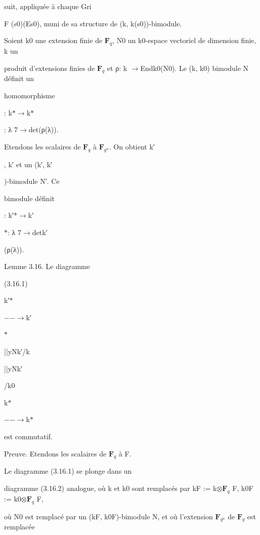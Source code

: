 \documentclass[11pt]{article}
\begin{document}
\noindent suit, appliquée à chaque Gri\par
\noindent F (s0)(Es0), muni de sa structure de (k, k(s0))-bimodule.\par
\noindent Soient k0 une extension finie de \(\mathbf F_q\), N0 un k0-espace vectoriel de dimension finie, k un\par
\noindent produit d’extensions finies de \(\mathbf F_q\) et ρ: k \(\to\)Endk0(N0). Le (k, k0) bimodule N définit un\par
\noindent homomorphisme\par
\noindent [N]: k\(*\)\(\to\)k\(*\)\par
{} : λ 7\(\to\)det(ρ(λ)).\par
\noindent Etendons les scalaires de \(\mathbf F_q\) à \(\mathbf F_{q^n}\). On obtient k′\par
{}, k′ et un (k′, k′\par
{})-bimodule N′. Ce\par
\noindent bimodule définit\par
\noindent [N′]: k′\(*\)\(\to\)k′\par
\noindent \(*\): λ 7\(\to\)detk′\par
{}(ρ(λ)).\par
\medskip
\noindent Lemme 3.16. Le diagramme\par
\noindent (3.16.1)\par
\noindent k′\(*\)\par
\noindent [N′]\par
\noindent −−\(\to\)k′\par
\noindent \(*\)\par
\noindent ||yNk′/k\par
\noindent ||yNk′\par
{}/k0\par
\noindent k\(*\)\par
\noindent [N]\par
\noindent −−\(\to\)k\(*\)\par
\noindent est commutatif.\par
\noindent Preuve. Etendons les scalaires de \(\mathbf F_q\) à F.\par
\noindent Le diagramme (3.16.1) se plonge dans un\par
\noindent diagramme (3.16.2) analogue, où k et k0 sont remplacés par kF := k\(\otimes\)\(\mathbf F_q\) F, k0F := k0\(\otimes\)\(\mathbf F_q\) F,\par
\noindent où N0 est remplacé par un (kF, k0F)-bimodule N, et où l’extension \(\mathbf F_{q^n}\) de \(\mathbf F_q\) est remplacée\par
\end{document}

